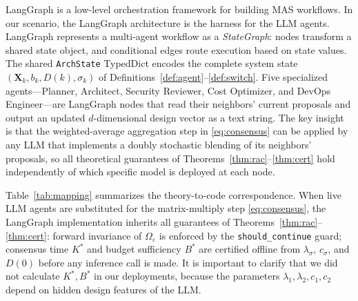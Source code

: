 \documentclass[journal,twoside,web]{ieeecolor_no_firstpage_logo}
\begin{document}
LangGraph is a low-level orchestration framework for building MAS workflows. In our scenario, the LangGraph architecture is the harness for the LLM agents. 
LangGraph represents a multi-agent workflow as a
\emph{StateGraph}: nodes transform a shared state object, and
conditional edges route execution based on state values.
The shared \texttt{ArchState} TypedDict encodes the complete
system state $(\mathbf{X}_k,b_k,D(k),\sigma_k)$ of
Definitions~\ref{def:agent}--\ref{def:switch}.
Five specialized agents---Planner, Architect, Security Reviewer,
Cost Optimizer, and DevOps Engineer---are LangGraph nodes that
read their neighbors' current proposals and output an updated
$d$-dimensional design vector as a text string. 
The key insight is that the weighted-average aggregation step
in \eqref{eq:consensus} can be applied by any LLM that
implements a doubly stochastic blending of its neighbors'
proposals, so all theoretical guarantees of
Theorems~\ref{thm:rac}--\ref{thm:cert} hold independently of
which specific model is deployed at each node.




Table~\ref{tab:mapping} summarizes the theory-to-code correspondence.
When live LLM agents are substituted for the matrix-multiply step \eqref{eq:consensus},
the LangGraph implementation inherits all guarantees of
Theorems~\ref{thm:rac}--\ref{thm:cert}:
forward invariance of $\Omega_\varepsilon$ is enforced by the
\texttt{should\_continue} guard; consensus time $K^*$ and budget
sufficiency $B^*$ are certified offline from $\lambda_\sigma$,
$c_\sigma$, and $D(0)$ before any inference call is made. It is important to clarify that we did not calculate $K^*, B^*$ in our deployments, because the parameters $\lambda_1,\lambda_2, c_1, c_2$ depend on hidden design features of the LLM. 
\end{document}
